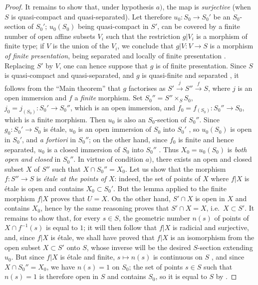 \begin{proof}
It remains to show that, under hypothesis $a)$, the map  is \emph{surjective} (when $S$ is quasi-compact and quasi-separated).
Let therefore $u_0:S_0\to S_0'$ be an $S_0$-section of $S_0'$;
$u_0(S_0)$ being quasi-compact in $S'$, can be covered by a finite number of open affine subsets $V_i$ such that the restriction $g|V_i$ is a morphism of finite type;
if $V$ is the union of the $V_i$, we conclude that $g|V:V\to S$ is a morphism \emph{of finite presentation}, being separated and locally of finite presentation .
Replacing $S'$ by $V$, one can hence suppose that $g$ is of finite presentation.
Since $S$ is quasi-compact and quasi-separated, and $g$ is quasi-finite and separated , it follows from the ``Main theorem''  that $g$ factorises as $S'\xrightarrow{j}S''\xrightarrow{f}S$, where $j$ is an open immersion and $f$ a \emph{finite} morphism.
Set $S_0''=S''\times_S S_0$, $j_0=j_{(S_0)}:S_0'\to S_0''$, which is an open immersion, and $f_0=f_{(S_0)}:S_0''\to S_0$, which is a finite morphism.
Then $u_0$ is also an $S_0$-section of $S_0''$.
Since $g_0:S_0'\to S_0$ is \'etale, $u_0$ is an open immersion of $S_0$ into $S_0'$ , so $u_0(S_0)$ is open in $S_0'$, and \emph{a fortiori} in $S_0''$;
on the other hand, since $f_0$ is finite and hence separated, $u_0$ is a closed immersion of $S_0$ into $S_0''$ .
Thus $X_0=u_0(S_0)$ is \emph{both open and closed} in $S_0''$.
In virtue of condition $a)$, there exists an open and closed subset $X$ of $S''$ such that $X\cap S_0''=X_0$.
Let us show that the morphism $f:S''\to S$ is \emph{\'etale at the points of $X$}:
indeed, the set of points of $X$ where $f|X$ is \'etale is open and contains $X_0\subset S_0'$.
But the lemma  applied to the finite morphism $f|X$ proves that $U=X$.
On the other hand, $S'\cap X$ is open in $X$ and contains $X_0$, hence by the same reasoning proves that $S'\cap X=X$, i.e.\ $X\subset S'$.
It remains to show that, for every $s\in S$, the geometric number $n(s)$ of points of $X\cap f^{-1}(s)$ is equal to $1$;
it will then follow that $f|X$ is radicial and surjective, and, since $f|X$ is \'etale, we shall have proved  that $f|X$ is an isomorphism from the open subset $X\subset S'$ onto $S$, whose inverse will be the desired $S$-section extending $u_0$.
But since $f|X$ is \'etale and finite, $s\mapsto n(s)$ is continuous on $S$ , and since $X\cap S_0''=X_0$, we have $n(s)=1$ on $S_0$;
the set of points $s\in S$ such that $n(s)=1$ is therefore open in $S$ and contains $S_0$, so it is equal to $S$ by .
\end{proof}


